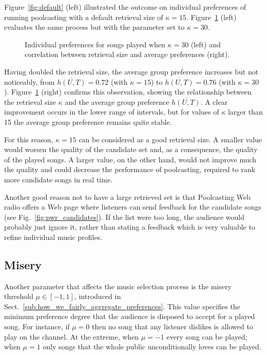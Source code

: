 Figure~\ref{fig:default} (left) illustrated the outcome on individual preferences of running poolcasting with a default retrieval size of $\kappa = 15$. 
Figure~\ref{fig:retr_2} (left) evaluates the same process but with the parameter set to $\kappa = 30$. 
%
\begin{figure}[bthp]
\centering \setlength{\abovecaptionskip}{3pt}
\caption{Individual preferences for songs played when $\kappa = 30$ (left) and correlation between retrieval size and average preferences (right).}
\label{fig:retr_2}
\end{figure}

Having doubled the retrieval size, the average group preference increases but not noticeably, from $\overline{h(U,T)} = 0.72$ (with $\kappa = 15$) to 
$\overline{h(U,T)} = 0.76$ (with $\kappa = 30$).
%
Figure~\ref{fig:retr_2} (right) confirms this observation, showing the relationship between the retrieval size $\kappa$ and the average group preference $\overline{h(U,T)}$.
A clear improvement occurs in the lower range of intervals, but for values of $\kappa$ larger than 15 the average group preference remains quite stable.

For this reason, $\kappa = 15$ can be considered as a good retrieval size.
A smaller value would worsen the quality of the candidate set and, as a consequence, the quality of the played songs.
A larger value, on the other hand, would not improve much the quality and could decrease the performance of poolcasting, required to rank more candidate songs in real time.

Another good reason not to have a large retrieved set is that Poolcasting Web radio offers a Web page where listeners can send feedback for the candidate songs (see Fig.~\ref{fig:pwr_candidates}). 
If the list were too long, the audience would probably just ignore it, rather than stating a feedback which is very valuable to refine individual music profiles.



\subsection{Misery} %
\label{sub:misery}

Another parameter that affects the music selection process is the misery threshold $\mu \in [-1,1]$, introduced in Sect.~\ref{sub:how_we_fairly_aggregate_preferences}.
This value specifies the minimum preference degree that the audience is disposed to accept for a played song. 
For instance, if $\mu = 0$ then no song that any listener dislikes is allowed to play on the channel.
At the extreme, when $\mu = -1$ every song can be played; when $\mu = 1$ only songs that the whole public unconditionally loves can be played.

